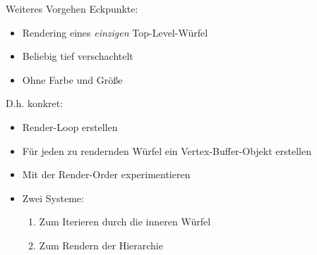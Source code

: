 \documentclass{../presentation}
\begin{document}
\begin{frame}{Weiteres Vorgehen}
    Eckpunkte:
    \begin{itemize}
        \item Rendering eines \emph{einzigen} Top-Level-Würfel
        \item Beliebig tief verschachtelt
        \item Ohne Farbe und Größe
    \end{itemize}
    D.h. konkret:
    \begin{itemize}
        \item Render-Loop erstellen
        \item Für jeden zu rendernden Würfel ein Vertex-Buffer-Objekt erstellen
        \item Mit der Render-Order experimentieren
        \item Zwei Systeme:
            \begin{enumerate}
                \item Zum Iterieren durch die inneren Würfel
                \item Zum Rendern der Hierarchie
            \end{enumerate}
    \end{itemize}
\end{frame}
\end{document}

